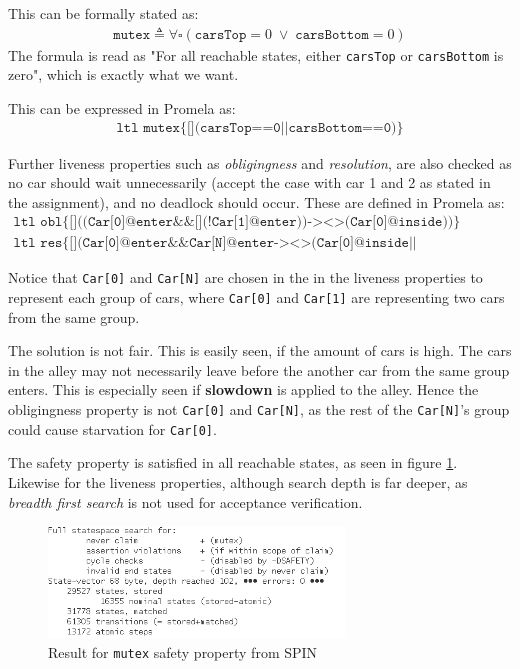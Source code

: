 This can be formally stated as:
\begin{gather*}
    \texttt{mutex} \triangleq \forall \square \left( \texttt{carsTop} = 0 \; \vee \; \texttt{carsBottom} = 0 \right) 
\end{gather*}
The formula is read as "For all reachable states, either \texttt{carsTop} or \texttt{carsBottom} is zero", which is exactly what we want.

This can be expressed in Promela as:
\begin{gather*}
    \texttt{ltl mutex\{[](carsTop==0||carsBottom==0)\} }
\end{gather*}

Further liveness properties such as \textit{obligingness} and \textit{resolution}, are also checked as no car should wait unnecessarily (accept the case with car 1 and 2 as stated in the assignment), and no deadlock should occur. These are defined in Promela as:
\begin{gather*}
    \texttt{
    ltl obl\{[]((Car[0]@enter\&\&[](!Car[1]@enter))-><>(Car[0]@inside))\}
    } \\
    \texttt{
    ltl res\{[](Car[0]@enter\&\&Car[N]@enter-><>(Car[0]@inside||Car[N]@inside))\}
    }
\end{gather*}

Notice that \texttt{Car[0]} and \texttt{Car[N]} are chosen in the in the liveness properties to represent each group of cars, where \texttt{Car[0]} and \texttt{Car[1]} are representing two cars from the same group.

The solution is not fair. This is easily seen, if the amount of cars is high. The cars in the alley may not necessarily leave before the another car from the same group enters. This is especially seen if \textbf{slowdown} is applied to the alley. Hence the obligingness property is not  \texttt{Car[0]} and \texttt{Car[N]}, as the rest of the \texttt{Car[N]}'s group could cause starvation for \texttt{Car[0]}.

The safety property is satisfied in all reachable states, as seen in figure \ref{fig:spinvalidation}. Likewise for the liveness properties, although search depth is far deeper, as \textit{breadth first search} is not used for acceptance verification.

\begin{figure}[H]
    \centering
    \includegraphics[width=0.7\textwidth]{fig/spinverification.png}
    \caption{Result for \texttt{mutex} safety property from SPIN}
    \label{fig:spinvalidation}
\end{figure}